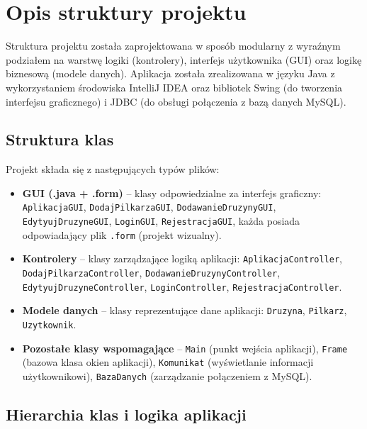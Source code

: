 \documentclass{urdpl}     %
\begin{document}
\chapter{Opis struktury projektu}

Struktura projektu została zaprojektowana w sposób modularny z wyraźnym podziałem na warstwę logiki (kontrolery), interfejs użytkownika (GUI) oraz logikę biznesową (modele danych). Aplikacja została zrealizowana w języku Java z wykorzystaniem środowiska IntelliJ IDEA oraz bibliotek Swing (do tworzenia interfejsu graficznego) i JDBC (do obsługi połączenia z bazą danych MySQL).

\section{Struktura klas}

Projekt składa się z następujących typów plików:

\begin{itemize}
  \item \textbf{GUI (.java + .form)} – klasy odpowiedzialne za interfejs graficzny: \texttt{AplikacjaGUI}, \texttt{DodajPilkarzaGUI}, \texttt{DodawanieDruzynyGUI}, \texttt{EdytyujDruzyneGUI}, \texttt{LoginGUI}, \texttt{RejestracjaGUI}, każda posiada odpowiadający plik \texttt{.form} (projekt wizualny).
  \item \textbf{Kontrolery} – klasy zarządzające logiką aplikacji: \texttt{AplikacjaController}, \texttt{DodajPilkarzaController}, \texttt{DodawanieDruzynyController}, \texttt{EdytyujDruzyneController}, \texttt{LoginController}, \texttt{RejestracjaController}.
  \item \textbf{Modele danych} – klasy reprezentujące dane aplikacji: \texttt{Druzyna}, \texttt{Pilkarz}, \texttt{Uzytkownik}.
  \item \textbf{Pozostałe klasy wspomagające} – \texttt{Main} (punkt wejścia aplikacji), \texttt{Frame} (bazowa klasa okien aplikacji), \texttt{Komunikat} (wyświetlanie informacji użytkownikowi), \texttt{BazaDanych} (zarządzanie połączeniem z MySQL).
\end{itemize}

\section{Hierarchia klas i logika aplikacji}
\end{document}
